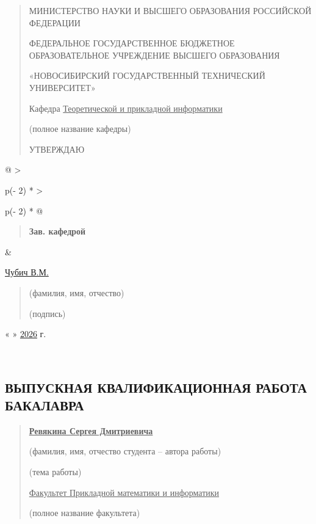 \documentclass[
]{article}
\author{}
\date{}
\begin{document}
\begin{quote}
МИНИСТЕРСТВО НАУКИ И ВЫСШЕГО ОБРАЗОВАНИЯ РОССИЙСКОЙ ФЕДЕРАЦИИ

ФЕДЕРАЛЬНОЕ ГОСУДАРСТВЕННОЕ БЮДЖЕТНОЕ ОБРАЗОВАТЕЛЬНОЕ УЧРЕЖДЕНИЕ ВЫСШЕГО
ОБРАЗОВАНИЯ

«НОВОСИБИРСКИЙ ГОСУДАРСТВЕННЫЙ ТЕХНИЧЕСКИЙ УНИВЕРСИТЕТ»

Кафедра \ul{Теоретической и прикладной информатики}

(полное название кафедры)

УТВЕРЖДАЮ
\end{quote}

\begin{longtable}[]{@{}
  >{\raggedright\arraybackslash}p{(\columnwidth - 2\tabcolsep) * }
  >{\raggedright\arraybackslash}p{(\columnwidth - 2\tabcolsep) * }@{}}
\toprule\noalign{}
\begin{minipage}[b]{\linewidth}\raggedright
\begin{quote}
\textbf{Зав. кафедрой}
\end{quote}
\end{minipage} & \begin{minipage}[b]{\linewidth}\raggedright
\ul{Чубич В.М.}

\begin{quote}
(фамилия, имя, отчество)

(подпись)
\end{quote}

« » \ul{2026} г.
\end{minipage} \\
\midrule\noalign{}
\endhead
\bottomrule\noalign{}
\endlastfoot
\end{longtable}

\hypertarget{ux432ux44bux43fux443ux441ux43aux43dux430ux44f-ux43aux432ux430ux43bux438ux444ux438ux43aux430ux446ux438ux43eux43dux43dux430ux44f-ux440ux430ux431ux43eux442ux430-ux431ux430ux43aux430ux43bux430ux432ux440ux430}{%
\subsection*{ВЫПУСКНАЯ КВАЛИФИКАЦИОННАЯ РАБОТА
БАКАЛАВРА}\label{ux432ux44bux43fux443ux441ux43aux43dux430ux44f-ux43aux432ux430ux43bux438ux444ux438ux43aux430ux446ux438ux43eux43dux43dux430ux44f-ux440ux430ux431ux43eux442ux430-ux431ux430ux43aux430ux43bux430ux432ux440ux430}}

\begin{quote}
\textbf{\ul{Ревякина Сергея Дмитриевича}}

(фамилия, имя, отчество студента -- автора работы)

(тема работы)

\ul{Факультет Прикладной математики и информатики}

(полное название факультета)
\end{quote}
\end{document}
